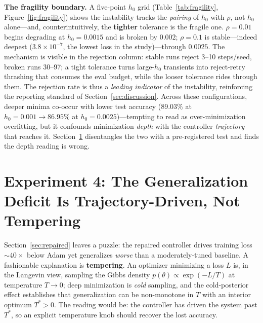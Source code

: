 \documentclass{article}
\begin{document}
\textbf{The fragility boundary.} A five-point $h_0$ grid (Table~\ref{tab:fragility}, Figure~\ref{fig:fragility}) shows the instability tracks the \emph{pairing} of $h_0$ with $\rho$, not $h_0$ alone---and, counterintuitively, the \textbf{tighter} tolerance is the fragile one. $\rho{=}0.01$ begins degrading at $h_0 = 0.0015$ and is broken by $0.002$; $\rho{=}0.1$ is stable---indeed deepest ($3.8\times 10^{-7}$, the lowest loss in the study)---through $0.0025$. The mechanism is visible in the rejection column: stable runs reject 3--10 steps/seed, broken runs 30--97; a tight tolerance turns large-$h_0$ transients into reject-retry thrashing that consumes the eval budget, while the looser tolerance rides through them. The rejection rate is thus a \emph{leading indicator} of the instability, reinforcing the reporting standard of Section~\ref{sec:discussion}. Across these configurations, deeper minima co-occur with lower test accuracy ($89.03\%$ at $h_0{=}0.001 \to 86.95\%$ at $h_0{=}0.0025$)---tempting to read as over-minimization overfitting, but it confounds minimization \emph{depth} with the controller \emph{trajectory} that reaches it. Section~\ref{sec:temperature} disentangles the two with a pre-registered test and finds the depth reading is wrong.

\section{Experiment 4: The Generalization Deficit Is Trajectory-Driven, Not Tempering}
\label{sec:temperature}

Section~\ref{sec:repaired} leaves a puzzle: the repaired controller drives training loss ${\sim}40\times$ below Adam yet generalizes \emph{worse} than a moderately-tuned baseline. A fashionable explanation is \textbf{tempering}. An optimizer minimizing a loss $L$ is, in the Langevin view, sampling the Gibbs density $p(\theta) \propto \exp(-L/T)$ at temperature $T \to 0$; deep minimization is \emph{cold} sampling, and the cold-posterior effect \cite{wenzel2020good} establishes that generalization can be non-monotone in $T$ with an interior optimum $T^* > 0$. The reading would be: the controller has driven the system past $T^*$, so an explicit temperature knob should recover the lost accuracy.
\end{document}
